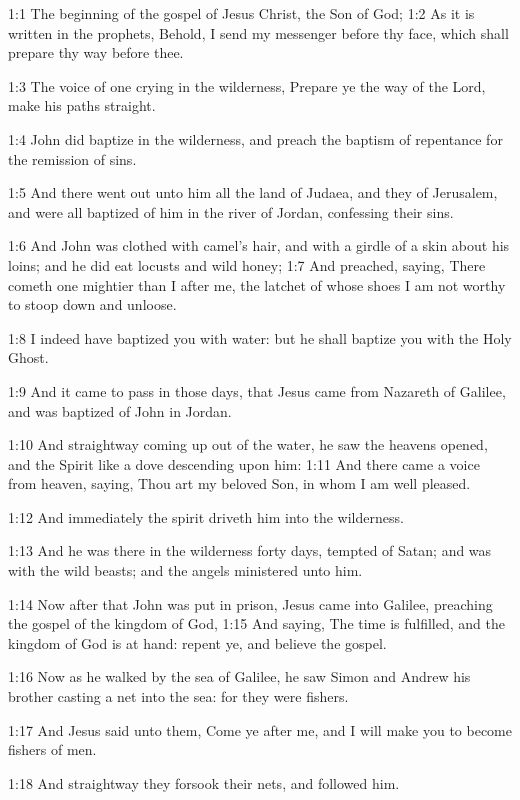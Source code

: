 

1:1 The beginning of the gospel of Jesus Christ, the Son of God; 1:2
As it is written in the prophets, Behold, I send my messenger before
thy face, which shall prepare thy way before thee.

1:3 The voice of one crying in the wilderness, Prepare ye the way of
the Lord, make his paths straight.

1:4 John did baptize in the wilderness, and preach the baptism of
repentance for the remission of sins.

1:5 And there went out unto him all the land of Judaea, and they of
Jerusalem, and were all baptized of him in the river of Jordan,
confessing their sins.

1:6 And John was clothed with camel's hair, and with a girdle of a
skin about his loins; and he did eat locusts and wild honey; 1:7 And
preached, saying, There cometh one mightier than I after me, the
latchet of whose shoes I am not worthy to stoop down and unloose.

1:8 I indeed have baptized you with water: but he shall baptize you
with the Holy Ghost.

1:9 And it came to pass in those days, that Jesus came from Nazareth
of Galilee, and was baptized of John in Jordan.

1:10 And straightway coming up out of the water, he saw the heavens
opened, and the Spirit like a dove descending upon him: 1:11 And there
came a voice from heaven, saying, Thou art my beloved Son, in whom I
am well pleased.

1:12 And immediately the spirit driveth him into the wilderness.

1:13 And he was there in the wilderness forty days, tempted of Satan;
and was with the wild beasts; and the angels ministered unto him.

1:14 Now after that John was put in prison, Jesus came into Galilee,
preaching the gospel of the kingdom of God, 1:15 And saying, The time
is fulfilled, and the kingdom of God is at hand: repent ye, and
believe the gospel.

1:16 Now as he walked by the sea of Galilee, he saw Simon and Andrew
his brother casting a net into the sea: for they were fishers.

1:17 And Jesus said unto them, Come ye after me, and I will make you
to become fishers of men.

1:18 And straightway they forsook their nets, and followed him.

